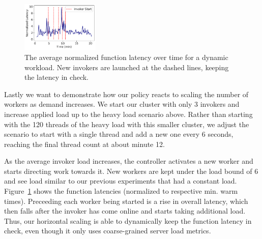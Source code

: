 \begin{figure}  \includegraphics[width=0.33\textwidth]{../figs/scaling/scaling_lat_over_time-nolabel.pdf}
  \vspace*{-0.3cm}
  \caption{The average normalized function latency over time for a dynamic workload. New invokers are launched at the dashed lines, keeping the latency in check.}
  \label{fig:scaling-latency}
  \vspace*{-0.3cm}
\end{figure}



Lastly we want to demonstrate how our policy reacts to scaling the number of workers as demand increases.
We start our cluster with only 3 invokers and increase applied load up to the heavy load scenario above.
Rather than starting with the 120 threads of the heavy load with this smaller cluster, we adjust the scenario to start with a single thread and add a new one every 6 seconds, reaching the final thread count at about minute 12.

As the average invoker load increases, the controller activates a new worker and starts directing work towards it.
New workers are kept under the load bound of 6 and see load similar to our previous experiments that had a constant load.
Figure~\ref{fig:scaling-latency} shows the function latencies (normalized to respective min. warm times). %
Preceeding each worker being started is a rise in overall latency, which then falls after the invoker has come online and starts taking additional load.
Thus, our horizontal scaling is able to dynamically keep the function latency in check, even though it only uses coarse-grained server load metrics.

